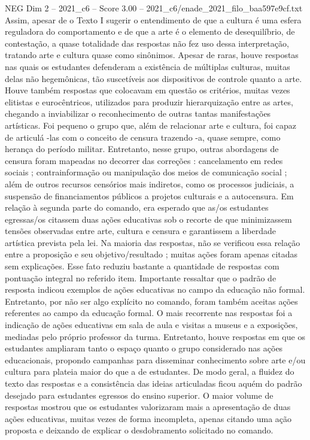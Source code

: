 \begin{textsample}{NEG Dim 2 – 2021\_c6 – Score 3.00 – 2021\_c6/enade\_2021\_filo\_baa597e9cf.txt}
Assim, apesar de o Texto I sugerir o entendimento de que a cultura é uma esfera reguladora do comportamento e de que a arte é o elemento de desequilíbrio, de contestação, a quase totalidade das respostas não fez uso dessa interpretação, tratando arte e cultura quase como sinônimos.
Apesar de raras, houve respostas nas quais os estudantes defenderam a existência de múltiplas culturas, muitas delas não hegemônicas, tão suscetíveis aos dispositivos de controle quanto a arte.
Houve também respostas que colocavam em questão os critérios, muitas vezes elitistas e eurocêntricos, utilizados para produzir hierarquização entre as artes, chegando a inviabilizar o reconhecimento de outras tantas manifestações artísticas.
Foi pequeno o grupo que, além de relacionar arte e cultura, foi capaz de articulá -las com o conceito de censura trazendo -a, quase sempre, como herança do período militar.
Entretanto, nesse grupo, outras abordagens de censura foram mapeadas no decorrer das correções : cancelamento em redes sociais ; contrainformação ou manipulação dos meios de comunicação social ; além de outros recursos censórios mais indiretos, como os processos judiciais, a suspensão de financiamentos públicos a projetos culturais e a autocensura.
Em relação à segunda parte do comando, era esperado que as/os estudantes egressas/os citassem duas ações educativas sob o recorte de que minimizassem tensões observadas entre arte, cultura e censura e garantissem a liberdade artística prevista pela lei.
Na maioria das respostas, não se verificou essa relação entre a proposição e seu objetivo/resultado ; muitas ações foram apenas citadas sem explicações.
Esse fato reduziu bastante a quantidade de respostas com pontuação integral no referido item.
Importante ressaltar que o padrão de resposta indicou exemplos de ações educativas no campo da educação não formal.
Entretanto, por não ser algo explícito no comando, foram também aceitas ações referentes ao campo da educação formal.
O mais recorrente nas respostas foi a indicação de ações educativas em sala de aula e visitas a museus e a exposições, mediadas pelo próprio professor da turma.
Entretanto, houve respostas em que os estudantes ampliaram tanto o espaço quanto o grupo considerado nas ações educacionais, propondo campanhas para disseminar conhecimento sobre arte e/ou cultura para plateia maior do que a de estudantes.
De modo geral, a fluidez do texto das respostas e a consistência das ideias articuladas ficou aquém do padrão desejado para estudantes egressos do ensino superior.
O maior volume de respostas mostrou que os estudantes valorizaram mais a apresentação de duas ações educativas, muitas vezes de forma incompleta, apenas citando uma ação proposta e deixando de explicar o desdobramento solicitado no comando.

\end{textsample}
